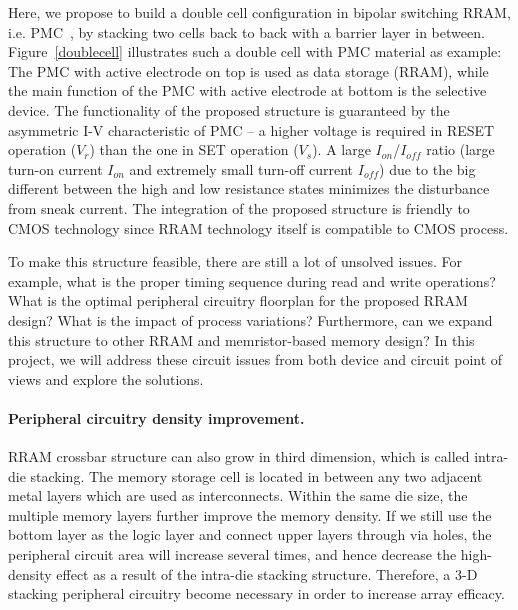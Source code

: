 Here, we propose to build a double cell configuration in bipolar switching RRAM, i.e. PMC~\cite{Kozicki05}, by stacking two cells back to back with a barrier layer in between. Figure~\ref{doublecell} illustrates such a double cell with PMC material as example: The PMC with active electrode on top is used as data storage (RRAM), while the main function of the PMC with active electrode at bottom is the selective device. The functionality of the proposed structure is guaranteed by the asymmetric I-V characteristic of PMC -- a higher voltage is required in RESET operation ($V_r$) than the one in SET operation ($V_s$). A large $I_{on}$/$I_{off}$ ratio (large turn-on current $I_{on}$ and extremely small turn-off current $I_{off}$) due to the big different between the high and low resistance states minimizes the disturbance from sneak current. The integration of the proposed structure is friendly to CMOS technology since RRAM technology itself is compatible to CMOS process.

To make this structure feasible, there are still a lot of unsolved issues. For example, what is the proper timing sequence during read and write operations? What is the optimal peripheral circuitry floorplan for the proposed RRAM design? What is the impact of process variations? Furthermore, can we expand this structure to other RRAM and memristor-based memory design? In this project, we will address these circuit issues from both device and circuit point of views and explore the solutions.

\paragraph{Peripheral circuitry density improvement.}
RRAM crossbar structure can also grow in third dimension, which is called intra-die stacking. The memory storage cell is located in between any two adjacent metal layers which are used as interconnects. Within the same die size, the multiple memory layers further improve the memory density. If we still use the bottom layer as the logic layer and connect upper layers through via holes, the peripheral circuit area will increase several times,  and hence decrease the high-density effect as a result of the intra-die stacking structure. Therefore, a 3-D stacking peripheral circuitry become necessary in order to increase array efficacy. 

